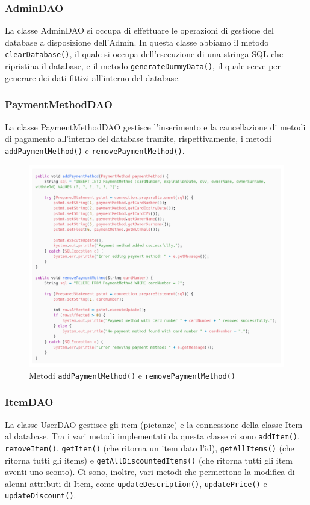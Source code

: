 \documentclass{article}
\begin{document}
\subsubsection{AdminDAO}
La classe AdminDAO si occupa di effettuare le operazioni di gestione del database a disposizione dell'Admin. In questa classe abbiamo il metodo \texttt{clearDatabase()}, il quale si occupa dell'esecuzione di una stringa SQL che ripristina il database, e il metodo \texttt{generateDummyData()}, il quale serve per generare dei dati fittizi all'interno del database.

\subsubsection{PaymentMethodDAO}
La classe PaymentMethodDAO gestisce l'inserimento e la cancellazione di metodi di pagamento all'interno del database tramite, rispettivamente, i metodi \texttt{addPaymentMethod()} e \texttt{removePaymentMethod()}.

\begin{figure}[!h]
    \includegraphics[width=1.0\linewidth]{imgs/snippets/Code_ClassPaymentMethod.png}
    \caption{Metodi \texttt{addPaymentMethod()} e \texttt{removePaymentMethod()}}
    \label{code_classPaymentMethodDAO}
\end{figure}

\clearpage

\subsubsection{ItemDAO}
La classe UserDAO gestisce gli item (pietanze) e la connessione della classe Item al database. Tra i vari metodi implementati da questa classe ci sono \texttt{addItem()}, \texttt{removeItem()}, \texttt{getItem()} (che ritorna un item dato l'id), \texttt{getAllItems()} (che ritorna tutti gli items) e \texttt{getAllDiscountedItems()} (che ritorna tutti gli item aventi uno sconto). Ci sono, inoltre, vari metodi che permettono la modifica di alcuni attributi di Item, come \texttt{updateDescription()}, \texttt{updatePrice()} e \texttt{updateDiscount()}.
\end{document}
